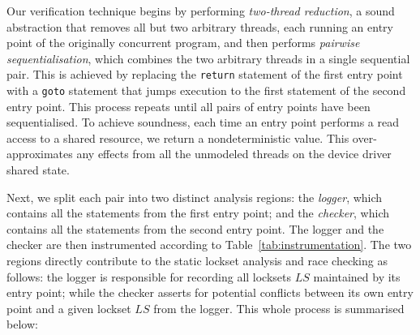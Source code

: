 Our verification technique begins by performing \emph{two-thread reduction}, a sound abstraction that removes all but two arbitrary threads, each running an entry point of the originally concurrent program, and then performs \emph{pairwise sequentialisation}, which combines the two arbitrary threads in a single sequential pair. This is achieved by replacing the \texttt{return} statement of the first entry point with a \texttt{goto} statement that jumps execution to the first statement of the second entry point. This process repeats until all pairs of entry points have been sequentialised. To achieve soundness, each time an entry point performs a read access to a shared resource, we return a nondeterministic value. This over-approximates any effects from all the unmodeled threads on the device driver shared state.

Next, we split each pair into two distinct analysis regions: the \emph{logger}, which contains all the statements from the first entry point; and the \emph{checker}, which contains all the statements from the second entry point. The logger and the checker are then instrumented according to Table~\ref{tab:instrumentation}. The two regions directly contribute to the static lockset analysis and race checking as follows: the logger is responsible for recording all locksets $\mathit{LS}$ maintained by its entry point; while the checker asserts for potential conflicts between its own entry point and a given lockset $\mathit{LS}$ from the logger. This whole process is summarised below:

